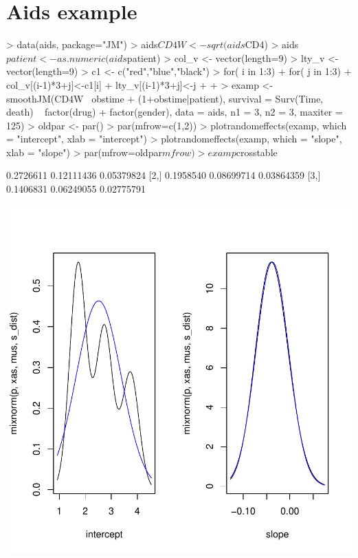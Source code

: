 \documentclass{article}
\begin{document}
\section{Aids example}
\begin{Schunk}
\begin{Sinput}
> data(aids, package="JM")
> aids$CD4W <- sqrt(aids$CD4)
> aids$patient <- as.numeric(aids$patient)
> col_v <- vector(length=9)
> lty_v <- vector(length=9)
> c1 <- c("red","blue","black")
> for( i in 1:3){
+    for( j in 1:3){
+       col_v[(i-1)*3+j]<-c1[i]
+       lty_v[(i-1)*3+j]<-j
+    }
+ }
> examp <- smoothJM(CD4W~ obstime + (1+obstime|patient), survival = Surv(Time, death) ~ factor(drug) + factor(gender), data =  aids, n1 = 3, n2 = 3, maxiter = 125)
> oldpar <- par()
> par(mfrow=c(1,2))
> plotrandomeffects(examp, which = "intercept", xlab = "intercept")
> plotrandomeffects(examp, which = "slope", xlab = "slope")
> par(mfrow=oldpar$mfrow)
> examp$crosstable
\end{Sinput}
\begin{Soutput}
          [,1]       [,2]       [,3]
[1,] 0.2726611 0.12111436 0.05379824
[2,] 0.1958540 0.08699714 0.03864359
[3,] 0.1406831 0.06249055 0.02775791
\end{Soutput}
\end{Schunk}
\includegraphics{tobdel2-003}
\end{document}
